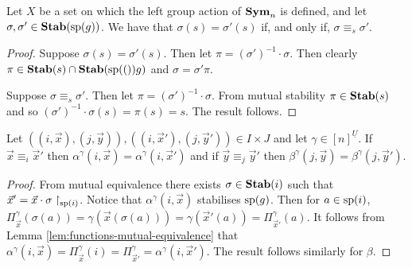 \documentclass[../paper.tex]{subfiles}
\begin{document}
\begin{lem}
  Let $X$ be a set on which the left group action of $\text{\textbf{Sym}}_n$ is defined, and
  let $\sigma, \sigma' \in \text{\textbf{Stab}}(\text{sp}(g))$. We have that $\sigma(s) = \sigma'
  (s)$ if, and only if, $\sigma \equiv_s \sigma'$.
  \label{lem:functions-mutual-equivalence}
\end{lem}
\begin{proof}
  Suppose $\sigma(s) = \sigma'(s)$. Then let $\pi = (\sigma')^{-1} \cdot
  \sigma$. Then clearly $\pi \in \text{\textbf{Stab}}(s) \cap \text{\textbf{Stab}} (\text{sp} (())g)$ and $\sigma = \sigma'
  \pi$.

  Suppose $\sigma \equiv_s \sigma'$. Then let $\pi = (\sigma')^{-1} \cdot
  \sigma$. From mutual stability $\pi \in \text{\textbf{Stab}} (s)$ and so $(\sigma')^{-1}\cdot
  \sigma (s) = \pi (s) = s$. The result follows.
\end{proof}

\begin{lem}
  Let $((i, \vec{x}), (j, \vec{y})), ((i, \vec{x}'), (j, \vec{y}')) \in I \times
  J$ and let $\gamma \in [n]^{\underline{U}}$. If $\vec{x} \equiv_i \vec{x}'$
  then $\alpha^{\gamma}(i, \vec{x}) = \alpha^{\gamma}(i, \vec{x}')$ and if
  $\vec{y} \equiv_j \vec{y}'$ then $\beta^{\gamma}(j, \vec{y}) =
  \beta^{\gamma}(j, \vec{y}')$.
  \label{lem:alpha-beta-mutal-equivalence}
\end{lem}
\begin{proof}
  From mutual equivalence there exists $\sigma \in \text{\textbf{Stab}}(i)$ such that $\vec{x}'
  = \vec{x} \cdot {\sigma}\restriction_{\text{sp}(i)}$. Notice that
  $\alpha^{\gamma}(i, \vec{x})$ stabilises $\text{sp}(g)$. Then for $a \in
  \text{sp}(i)$, $\Pi^{\gamma}_{\vec{x}} (\sigma (a)) = \gamma (\vec{x}(\sigma
  (a))) = \gamma (\vec{x}'(a)) = \Pi^{\gamma}_{\vec{x}'}(a)$. It follows from
  Lemma \ref{lem:functions-mutual-equivalence} that $\alpha^{\gamma}(i,\vec{x})
  = \Pi^{\gamma}_{\vec{x}} (i) = \Pi^{\gamma}_{\vec{x}'} = \alpha^{\gamma}(i,
  \vec{x}')$. The result follows similarly for $\beta$.
\end{proof}

\end{document}
